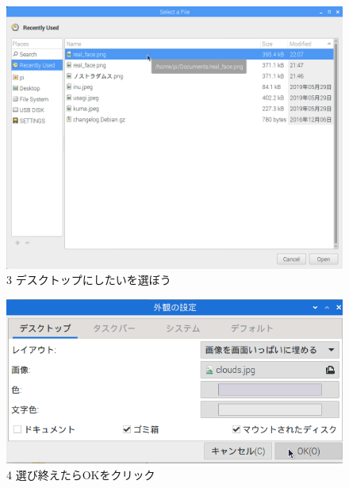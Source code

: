 \documentclass[a4paper,12pt]{jarticle}
\begin{document}
\begin{figure}
\begin{minipage}{\textwidth}
    \begin{minipage}{0.45\textwidth}
      \includegraphics[width=0.85\linewidth]{textbook-img110.png}\\
      3 デスクトップにしたいを選ぼう
    \end{minipage}
    \begin{minipage}{2.582cm}
    \end{minipage}
    \begin{minipage}{0.45\textwidth}
      \includegraphics[width=0.85\linewidth]{textbook-img109.png}\\
      4 選び終えたらOKをクリック
    \end{minipage}

  \end{minipage}

  \bigskip



\end{figure}
\end{document}
